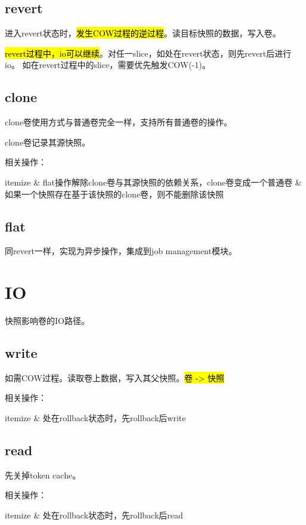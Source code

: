 \subsection{revert}

进入revert状态时，\hl{发生COW过程的逆过程}。读目标快照的数据，写入卷。

\hl{revert过程中，io可以继续}。对任一slice，如处在revert状态，则先revert后进行io。
如在revert过程中的slice，需要优先触发COW(-1)。

\subsection{clone}

clone卷使用方式与普通卷完全一样，支持所有普通卷的操作。

clone卷记录其源快照。

相关操作：
\begin{myeasylist}{itemize}
    & flat操作解除clone卷与其源快照的依赖关系，clone卷变成一个普通卷
    & 如果一个快照存在基于该快照的clone卷，则不能删除该快照
\end{myeasylist}

\subsection{flat}

同revert一样，实现为异步操作，集成到job management模块。

\section{IO}

快照影响卷的IO路径。

\subsection{write}

如需COW过程。读取卷上数据，写入其父快照。\hl{卷 -> 快照}

相关操作：
\begin{myeasylist}{itemize}
    & 处在rollback状态时，先rollback后write
\end{myeasylist}

\subsection{read}

先关掉token cache。

相关操作：
\begin{myeasylist}{itemize}
    & 处在rollback状态时，先rollback后read
\end{myeasylist}

